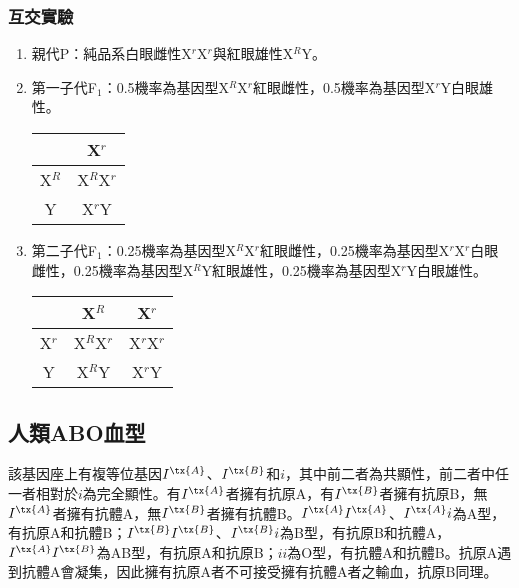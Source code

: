 \documentclass[a4paper,12pt]{report}
\begin{document}
\subsubsection{互交實驗}
\begin{enumerate}
\item 親代P：純品系白眼雌性X$^r$X$^r$與紅眼雄性X$^R$Y。
\item 第一子代F$_1$：0.5機率為基因型X$^R$X$^r$紅眼雌性，0.5機率為基因型X$^r$Y白眼雄性。
\begin{center}
\begin{tabular}{|c|c|}
\hline
& X$^r$ \\ \hline
X$^R$ & X$^R$X$^r$ \\ \hline
Y & X$^r$Y \\ \hline
\end{tabular}
\end{center}
\item 第二子代F$_1$：0.25機率為基因型X$^R$X$^r$紅眼雌性，0.25機率為基因型X$^r$X$^r$白眼雌性，0.25機率為基因型X$^R$Y紅眼雄性，0.25機率為基因型X$^r$Y白眼雄性。
\begin{center}
\begin{tabular}{|c|c|c|}
\hline
& X$^R$ & X$^r$ \\ \hline
X$^r$ & X$^R$X$^r$ & X$^r$X$^r$ \\ \hline
Y & X$^R$Y & X$^r$Y \\ \hline
\end{tabular}
\end{center}
\end{enumerate}
\subsection{人類ABO血型}
該基因座上有複等位基因$I^{\tx{A}}$、$I^{\tx{B}}$和$i$，其中前二者為共顯性，前二者中任一者相對於$i$為完全顯性。有$I^{\tx{A}}$者擁有抗原A，有$I^{\tx{B}}$者擁有抗原B，無$I^{\tx{A}}$者擁有抗體A，無$I^{\tx{B}}$者擁有抗體B。$I^{\tx{A}}I^{\tx{A}}$、$I^{\tx{A}}i$為A型，有抗原A和抗體B；$I^{\tx{B}}I^{\tx{B}}$、$I^{\tx{B}}i$為B型，有抗原B和抗體A，$I^{\tx{A}}I^{\tx{B}}$為AB型，有抗原A和抗原B；$ii$為O型，有抗體A和抗體B。抗原A遇到抗體A會凝集，因此擁有抗原A者不可接受擁有抗體A者之輸血，抗原B同理。
\end{document}
